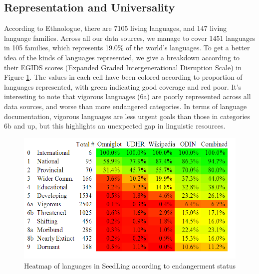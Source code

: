 \subsection{Representation and Universality} \label{sec:stats}

According to Ethnologue, there are 7105 living languages, and 147 living language families. Across all our data sources, we manage to cover 1451 languages in 105 families, which represents 19.0\% of the world's languages. To get a better idea of the kinds of languages represented, we give a breakdown according to their EGIDS scores (Expanded Graded Intergenerational Disruption Scale) \cite{lewis2010assessing} in Figure \ref{fig:heatmap}. The values in each cell have been colored according to proportion of languages represented, with green indicating good coverage and red poor. It's interesting to note that vigorous languages (6a) are poorly represented across all data sources, and worse than more endangered categories. In terms of language documentation, vigorous languages are less urgent goals than those in categories 6b and up, but this highlights an unexpected gap in linguistic resources.

\begin{figure}[t]
\begin{centering}
\includegraphics[scale=0.63]{heatmap-numbers.png}
\caption{Heatmap of languages in SeedLing according to endangerment status}\label{fig:heatmap}
\end{centering}
\end{figure}
